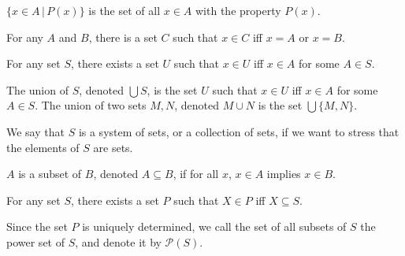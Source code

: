 \documentclass{article}
\begin{document}
\begin{definition}
	\(\{x\in A\,|\,P(x)\}\) is the set of all \(x\in A\) with the property \(P(x)\).
\end{definition}
\begin{axiom}
	For any \(A\) and \(B\), there is a set \(C\) such that \(x\in C\) iff \(x=A\) or \(x=B\).
\end{axiom}
\begin{axiom}
	For any set \(S\), there exists a set \(U\) such that \(x\in U\) iff \(x\in A\) for some \(A\in S\).
\end{axiom}
\begin{definition}[Union]
	The union of \(S\), denoted \(\bigcup S\), is the set \(U\) such that \(x\in U\) iff \(x\in A\) for some \(A\in S\). The union of two sets \(M,N\), denoted \(M\cup N\) is the set \(\bigcup\{M,N\}\).
\end{definition}
\begin{remark}
	We say that \(S\) is a system of sets, or a collection of sets, if we want to stress that the elements of \(S\) are sets.
\end{remark}
\begin{definition}[Subset]
	\(A\) is a subset of \(B\), denoted \(A\subseteq B\), if for all \(x\), \(x\in A\) implies \(x\in B\).
\end{definition}
\begin{axiom}
	For any set \(S\), there exists a set \(P\) such that \(X\in P\) iff \(X\subseteq S\).
\end{axiom}
\begin{definition}
	Since the set \(P\) is uniquely determined, we call the set of all subsets of \(S\) the power set of \(S\), and denote it by \(\mathcal{P}(S)\).
\end{definition}
\end{document}
